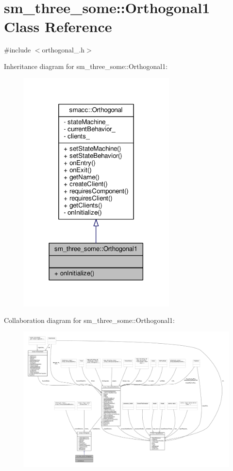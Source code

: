 \hypertarget{classsm__three__some_1_1Orthogonal1}{}\section{sm\+\_\+three\+\_\+some\+:\+:Orthogonal1 Class Reference}
\label{classsm__three__some_1_1Orthogonal1}


{\ttfamily \#include $<$orthogonal\+\_.\+h$>$}



Inheritance diagram for sm\+\_\+three\+\_\+some\+:\+:Orthogonal1\+:
\nopagebreak
\begin{figure}[H]
\begin{center}
\leavevmode
\includegraphics[width=225pt]{classsm__three__some_1_1Orthogonal1__inherit__graph}
\end{center}
\end{figure}


Collaboration diagram for sm\+\_\+three\+\_\+some\+:\+:Orthogonal1\+:
\nopagebreak
\begin{figure}[H]
\begin{center}
\leavevmode
\includegraphics[width=350pt]{classsm__three__some_1_1Orthogonal1__coll__graph}
\end{center}
\end{figure}
